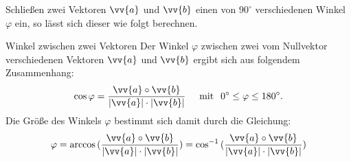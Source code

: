 Schließen zwei Vektoren $\vv{a}$ und $\vv{b}$ einen von $90^{\circ}$ verschiedenen Winkel $\varphi$ ein, so lässt sich dieser wie folgt berechnen.
\begin{merke}{Winkel zwischen zwei Vektoren}{}
Der Winkel $\varphi$ zwischen zwei vom Nullvektor verschiedenen Vektoren $\vv{a}$ und $\vv{b}$ ergibt sich aus folgendem Zusammenhang: $$\cos{\varphi} = \dfrac{\vv{a} \circ \vv{b}}{|\vv{a}| \cdot |\vv{b}|}\hspace{0.5cm}\text{mit}\hspace{0.25cm} 0^{\circ} \leq \varphi \leq 180^{\circ}.$$ 
Die Größe des Winkels $\varphi$ bestimmt sich damit durch die Gleichung:
$$\varphi = \arccos{(\dfrac{\vv{a} \circ \vv{b}}{|\vv{a}| \cdot |\vv{b}|})} = \cos^{-1}{(\dfrac{\vv{a} \circ \vv{b}}{|\vv{a}| \cdot |\vv{b}|})}$$
\end{merke}
